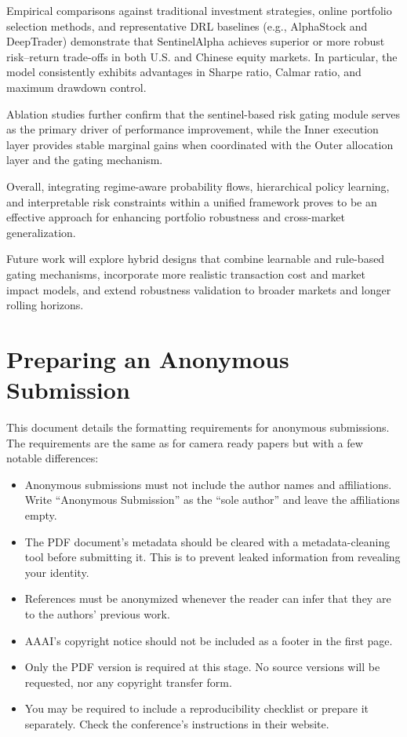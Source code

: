 \documentclass[letterpaper]{article} %
\begin{document}
Empirical comparisons against traditional investment strategies, online portfolio selection methods, and representative DRL baselines (e.g., AlphaStock and DeepTrader) demonstrate that SentinelAlpha achieves superior or more robust risk--return trade-offs in both U.S. and Chinese equity markets. In particular, the model consistently exhibits advantages in Sharpe ratio, Calmar ratio, and maximum drawdown control. 

Ablation studies further confirm that the sentinel-based risk gating module serves as the primary driver of performance improvement, while the Inner execution layer provides stable marginal gains when coordinated with the Outer allocation layer and the gating mechanism.

Overall, integrating regime-aware probability flows, hierarchical policy learning, and interpretable risk constraints within a unified framework proves to be an effective approach for enhancing portfolio robustness and cross-market generalization.

Future work will explore hybrid designs that combine learnable and rule-based gating mechanisms, incorporate more realistic transaction cost and market impact models, and extend robustness validation to broader markets and longer rolling horizons.

\section{Preparing an Anonymous Submission}

This document details the formatting requirements for anonymous submissions. The requirements are the same as for camera ready papers but with a few notable differences:

\begin{itemize}
    \item Anonymous submissions must not include the author names and affiliations. Write ``Anonymous Submission'' as the ``sole author'' and leave the affiliations empty.
    \item The PDF document's metadata should be cleared with a metadata-cleaning tool before submitting it. This is to prevent leaked information from revealing your identity.
    \item References must be anonymized whenever the reader can infer that they are to the authors' previous work.
    \item AAAI's copyright notice should not be included as a footer in the first page.
    \item Only the PDF version is required at this stage. No source versions will be requested, nor any copyright transfer form.
    \item You may be required to include a reproducibility checklist or prepare it separately. Check the conference's instructions in their website.
\end{itemize}
\end{document}
